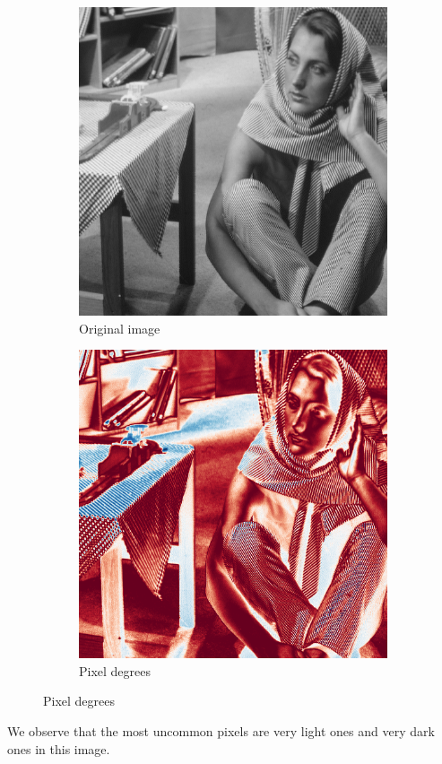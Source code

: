 \begin{figure}[H]
    \centering
    \begin{subfigure}[b]{0.45\textwidth}
        \includegraphics[width=\textwidth]{img/barbara.png}
        \caption{Original image}
    \end{subfigure}
    \begin{subfigure}[b]{0.45\textwidth}
        \includegraphics[width=\textwidth]{img/pixelDegrees.png}
        \caption{Pixel degrees}
    \end{subfigure}
\end{figure}
We observe that the most uncommon pixels are very light ones and very dark ones in this image.

